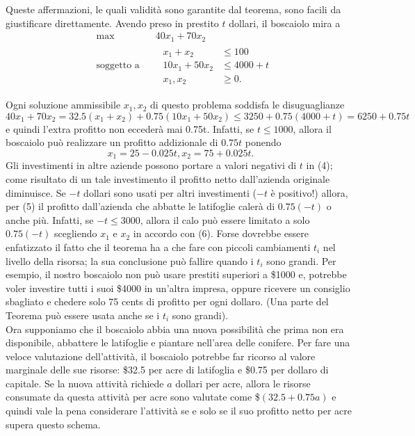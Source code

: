\documentclass[a4paper,11pt]{article}
\begin{document}
	Queste affermazioni, le quali validità sono garantite dal teorema, sono facili da giustificare direttamente. Avendo preso in prestito $t$ dollari, il boscaiolo mira a
			\begin{equation}\begin{split}
	&\text{max}\qquad\qquad\ 40x_1+70x_2\\
	&\text{soggetto a} \qquad
	\begin{split} 
	x_1+x_2&\leq 100\\
	10x_1+50x_2&\leq 4000+t\\
	x_1,x_2&\geq0.
	\end{split}
	\end{split}
	\end{equation}
	
	Ogni soluzione ammissibile $x_1, x_2$ di questo problema soddisfa le disuguaglianze
	\begin{equation}
	40x_1+70x_2=32.5(x_1+x_2)+0.75(10x_1+50x_2)\leq3250+0.75(4000+t)=6250+0.75t
	\end{equation}
	e quindi l'extra profitto non eccederà mai 0.75t. Infatti, se $t\leq1000$, allora il boscaiolo può realizzare un profitto addizionale di $0.75t$ ponendo
	\begin{equation}
	x_1=25-0.025t, x_2=75+0.025t.
	\end{equation}
	Gli investimenti in altre aziende possono portare a valori negativi di $t$ in (4); come risultato di un tale investimento il profitto netto dall'azienda originale diminuisce. Se $-t$ dollari sono usati per altri investimenti ($-t$ è positivo!) allora, per (5) il profitto dall'azienda che abbatte le latifoglie calerà di $0.75(-t)$ o anche più. Infatti, se $-t\leq3000$, allora il calo può essere limitato a solo $0.75(-t)$ scegliendo $x_1$ e $x_2$ in accordo con (6).
	Forse dovrebbe essere enfatizzato il fatto che il teorema ha a che fare con piccoli cambiamenti $t_i$ nel livello della risorsa; la sua conclusione può fallire quando i $t_i$ sono grandi. Per esempio, il nostro boscaiolo non può usare prestiti superiori a \$1000 e, potrebbe voler investire tutti i suoi \$4000 in un'altra impresa, oppure ricevere un consiglio sbagliato e chedere solo 75 cents di profitto per ogni dollaro. (Una parte del Teorema può essere usata anche se i $t_i$ sono grandi).
\\

Ora supponiamo che il boscaiolo abbia una nuova possibilità che prima non era disponibile, abbattere le latifoglie e piantare nell'area delle conifere.
Per fare una veloce valutazione dell'attività, il boscaiolo potrebbe far ricorso al valore marginale delle sue risorse: \$32.5 per acre di latifoglia e \$0.75 per dollaro di capitale. Se la nuova attività richiede $a$ dollari per acre, allora le risorse consumate da questa attività per acre sono valutate come \$$(32.5+0.75a)$ e quindi vale la pena considerare l'attività se e solo se il suo profitto netto per acre supera questo schema. 
\\
\end{document}
